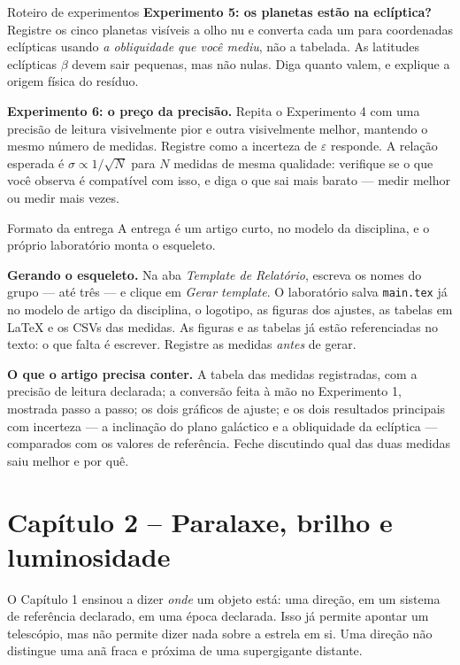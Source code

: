 \documentclass[11pt,a4paper]{article}
\begin{document}
\begin{lessonblock}[borderline west={2pt}{0pt}{astroGold}]{Roteiro de experimentos}
\textbf{Experimento 5: os planetas estão na eclíptica?}
Registre os cinco planetas visíveis a olho nu e converta cada um para coordenadas eclípticas usando \emph{a
obliquidade que você mediu}, não a tabelada. As latitudes eclípticas $\beta$ devem sair pequenas, mas não nulas.
Diga quanto valem, e explique a origem física do resíduo.

\textbf{Experimento 6: o preço da precisão.}
Repita o Experimento 4 com uma precisão de leitura visivelmente pior e outra visivelmente melhor, mantendo o
mesmo número de medidas. Registre como a incerteza de $\varepsilon$ responde. A relação esperada é
$\sigma\propto1/\sqrt{N}$ para $N$ medidas de mesma qualidade: verifique se o que você observa é compatível com
isso, e diga o que sai mais barato --- medir melhor ou medir mais vezes.
\end{lessonblock}

\begin{lessonblock}[borderline west={2pt}{0pt}{astroGold}]{Formato da entrega}
A entrega é um artigo curto, no modelo da disciplina, e o próprio laboratório monta o esqueleto.

\textbf{Gerando o esqueleto.} Na aba \textit{Template de Relatório}, escreva os nomes do grupo --- até três ---
e clique em \textit{Gerar template}. O laboratório salva \texttt{main.tex} já no modelo de artigo da
disciplina, o logotipo, as figuras dos ajustes, as tabelas em LaTeX e os CSVs das medidas. As figuras e as
tabelas já estão referenciadas no texto: o que falta é escrever. Registre as medidas \emph{antes} de gerar.

\textbf{O que o artigo precisa conter.} A tabela das medidas registradas, com a precisão de leitura declarada;
a conversão feita à mão no Experimento 1, mostrada passo a passo; os dois gráficos de ajuste; e os dois
resultados principais com incerteza --- a inclinação do plano galáctico e a obliquidade da eclíptica ---
comparados com os valores de referência. Feche discutindo qual das duas medidas saiu melhor e por quê.
\end{lessonblock}


\newpage
\section*{Capítulo 2 -- Paralaxe, brilho e luminosidade}
O Capítulo 1 ensinou a dizer \emph{onde} um objeto está: uma direção, em um sistema de referência declarado, em uma época declarada. Isso já permite apontar um telescópio, mas não permite dizer nada sobre a estrela em si. Uma direção não distingue uma anã fraca e próxima de uma supergigante distante.
\end{document}
